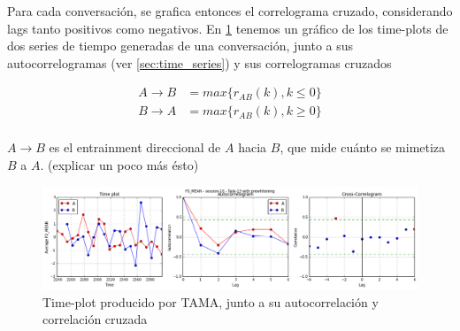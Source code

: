 Para cada conversación, se grafica entonces el correlograma cruzado, considerando lags tanto positivos como negativos. En \ref{time_plot_with_bivariate} tenemos un gráfico de los time-plots de dos series de tiempo generadas de una conversación, junto a sus autocorrelogramas (ver \ref{sec:time_series}) y sus correlogramas cruzados


\begin{align}
  A \rightarrow B &= max \{ r_{AB}(k), k \leq 0 \} \\
  B \rightarrow A &= max \{ r_{AB}(k), k \geq 0 \} \\
\end{align}


$A \rightarrow B$ es el entrainment direccional de $A$ hacia $B$, que mide cuánto se mimetiza $B$ a $A$. (explicar un poco más ésto)

\begin{figure}
\centering
\includegraphics[width=15cm]{images/time_plot_with_cross_correlation.png}
\caption{Time-plot producido por TAMA, junto a su autocorrelación y correlación cruzada\label{time_plot_with_bivariate}}
\end{figure}
